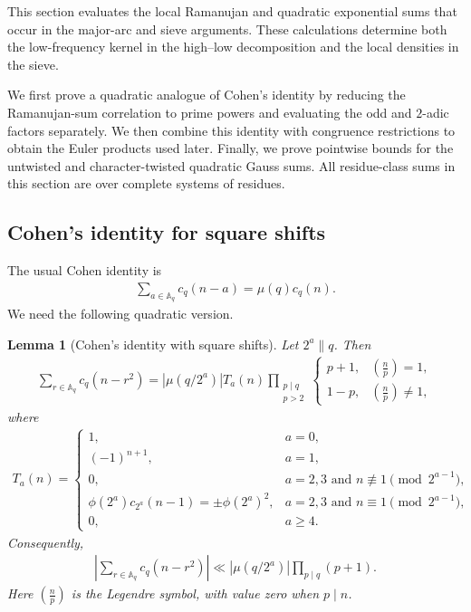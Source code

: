 \documentclass[12pt,reqno]{amsart}
\numberwithin{equation}{section}
\newtheorem{lemma}[equation]{Lemma}
\theoremstyle{definition}
\theoremstyle{remark}
\begin{document}
This section evaluates the local Ramanujan and quadratic exponential sums that occur in the major-arc and sieve arguments. These calculations determine both the low-frequency kernel in the high--low decomposition and the local densities in the sieve.

We first prove a quadratic analogue of Cohen's identity by reducing the
Ramanujan-sum correlation to prime powers and evaluating the odd and
$2$-adic factors separately. We then combine this identity with congruence restrictions to obtain the Euler products used later. Finally, we prove
pointwise bounds for the untwisted and character-twisted quadratic Gauss
sums. 
All residue-class sums in this section are over complete
systems of residues.

\subsection{Cohen's identity for square shifts}

The usual Cohen identity is
\begin{align*}
 \sum_{a\in\mathbb A_q}c_q(n-a)=\mu(q)c_q(n).
\end{align*}
We need the following quadratic version.

\begin{lemma}[Cohen's identity with square shifts]\label{l:cohenquadratic}
Let $2^a\parallel q$.  Then
\begin{align}\label{e:cohenquadratic}
 \sum_{r\in\mathbb A_q}c_q(n-r^2)
 =|\mu(q/2^a)| T_a(n)
 \prod_{\substack{p\mid q\\p>2}}
 \begin{cases}
  p+1,&\left(\frac np\right)=1,\\
  1-p,&\left(\frac np\right)\ne1,
 \end{cases}
\end{align}
where
\begin{align}\label{e:Ta}
 T_a(n)=
 \begin{cases}
  1,&a=0,\\
  (-1)^{n+1},&a=1,\\
  0,&a=2,3\text{ and }n\not\equiv1\pmod{2^{a-1}},\\
  \phi(2^a)c_{2^a}(n-1)=\pm\phi(2^a)^2,
    &a=2,3\text{ and }n\equiv1\pmod{2^{a-1}},\\
  0,&a\geq4.
 \end{cases}
\end{align}
Consequently,
\begin{align}\label{e:CohenQuadratic}
 \left|\sum_{r\in\mathbb A_q}c_q(n-r^2)\right|
 \ll |\mu(q/2^a)|\prod_{p\mid q}(p+1).
\end{align}
Here $(\frac np)$ is the Legendre symbol, with value zero when $p\mid n$.
\end{lemma}
\end{document}
